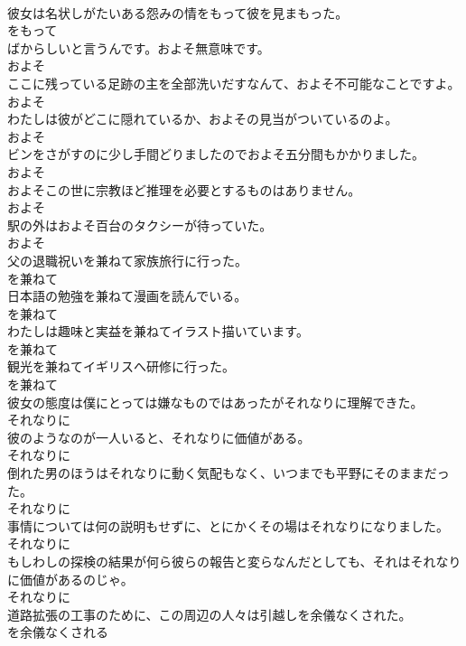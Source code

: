 \documentclass[8pt]{extreport}
\begin{document}
\begin{CJK}{UTF8}{min}
\\	彼女は名状しがたいある怨みの情をもって彼を見まもった。	
\\	をもって
\\	ばからしいと言うんです。およそ無意味です。	
\\	およそ
\\	ここに残っている足跡の主を全部洗いだすなんて、およそ不可能なことですよ。	
\\	およそ
\\	わたしは彼がどこに隠れているか、およその見当がついているのよ。	
\\	およそ
\\	ビンをさがすのに少し手間どりましたのでおよそ五分間もかかりました。	
\\	およそ
\\	およそこの世に宗教ほど推理を必要とするものはありません。	
\\	およそ
\\	駅の外はおよそ百台のタクシーが待っていた。	
\\	およそ
\\	父の退職祝いを兼ねて家族旅行に行った。	
\\	を兼ねて
\\	日本語の勉強を兼ねて漫画を読んでいる。	
\\	を兼ねて
\\	わたしは趣味と実益を兼ねてイラスト描いています。	
\\	を兼ねて
\\	観光を兼ねてイギリスへ研修に行った。	
\\	を兼ねて
\\	彼女の態度は僕にとっては嫌なものではあったがそれなりに理解できた。	
\\	それなりに
\\	彼のようなのが一人いると、それなりに価値がある。	
\\	それなりに
\\	倒れた男のほうはそれなりに動く気配もなく、いつまでも平野にそのままだった。	
\\	それなりに
\\	事情については何の説明もせずに、とにかくその場はそれなりになりました。	
\\	それなりに
\\	もしわしの探検の結果が何ら彼らの報告と変らなんだとしても、それはそれなりに価値があるのじゃ。	
\\	それなりに
\\	道路拡張の工事のために、この周辺の人々は引越しを余儀なくされた。	
\\	を余儀なくされる

\end{CJK}
\end{document}
